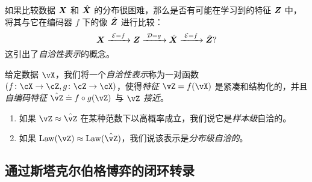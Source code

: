 \documentclass[../../book-main.tex]{subfiles}
\begin{document}
如果比较数据 $\bm{X}$ 和 $\hat {\bm{X}}$ 的分布很困难，那么是否有可能在学习到的特征 $\bm{Z}$ 中，将其与它在编码器 $f$ 下的像 $\hat {\bm{Z}}$ 进行比较：
\begin{equation}
 \bm{X}
\xrightarrow{\hspace{1mm} \mathcal{E} = f \hspace{1mm}} \bm{Z}  \xrightarrow{\hspace{1mm} \mathcal{D} = g \hspace{1mm}} \hat{\bm{X}} \xrightarrow{\hspace{1mm} \mathcal{E} = f \hspace{1mm}} \hat {\bm{Z}}?
\label{eqn:closed-autoencoding}
\end{equation}
这引出了{\em 自洽性表示}的概念。
\begin{definition}[自洽性表示]\label{def:closed_loop}
    给定数据 \(\vX\)，我们将一个\textit{自洽性表示}称为一对函数 \((f \colon \cX \to \cZ, g \colon \cZ \to \cX)\)，使得\textit{特征} \(\vZ = f(\vX)\) 是紧凑和结构化的，并且\textit{自编码特征} \(\hat{\vZ} \doteq f \circ g(\vZ)\) 与 \(\vZ\) \textit{接近}。
    \begin{enumerate}
        \item 如果 \(\vZ \approx \hat{\vZ}\) 在某种范数下以高概率成立，我们说它是\textit{样本级}自洽的。
        \item 如果 \(\Law(\vZ) \approx \Law(\hat{\vZ})\)，我们说该表示是\textit{分布级自洽的}。
    \end{enumerate}
\end{definition}



\subsection{通过斯塔克尔伯格博弈的闭环转录}\label{sec:closed-loop-transcription}

\end{document}
